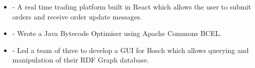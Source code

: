 
\begin{cvparagraph}
  \begin{itemize}[leftmargin=2ex, nosep, noitemsep]
    \item { - A real time trading platform built in React which allows the user to submit orders and
      receive order update messages.}
    \item { - Wrote a Java Bytecode Optimiser using Apache Commons BCEL.}
    \item { - Led a team of three to develop a GUI for Bosch which allows querying and manipulation of their RDF Graph database.}
  \end{itemize}
\end{cvparagraph}
